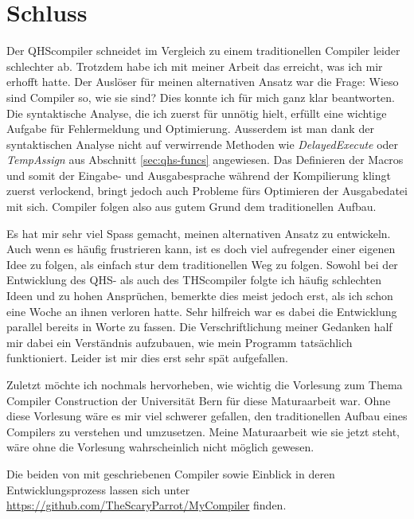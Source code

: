 \chapter{Schluss}
Der QHScompiler schneidet im Vergleich zu einem traditionellen Compiler leider schlechter ab.
Trotzdem habe ich mit meiner Arbeit das erreicht, was ich mir erhofft hatte. Der Auslöser für meinen alternativen Ansatz war die Frage: Wieso sind Compiler so, wie sie sind? 
Dies konnte ich für mich ganz klar beantworten. Die syntaktische Analyse, die ich zuerst für unnötig hielt, erfüllt eine wichtige Aufgabe für Fehlermeldung und Optimierung.
Ausserdem ist man dank der syntaktischen Analyse nicht auf verwirrende Methoden wie \textit{DelayedExecute} oder \textit{TempAssign} aus Abschnitt \ref{sec:qhs-funcs} angewiesen.
Das Definieren der Macros und somit der Eingabe- und Ausgabesprache während der Kompilierung klingt zuerst verlockend, bringt jedoch auch Probleme fürs Optimieren der Ausgabedatei mit sich.
Compiler folgen also aus gutem Grund dem traditionellen Aufbau.

Es hat mir sehr viel Spass gemacht, meinen alternativen Ansatz zu entwickeln. Auch wenn es häufig frustrieren kann, ist es doch viel aufregender einer eigenen Idee zu folgen, als einfach stur dem traditionellen Weg zu folgen.
Sowohl bei der Entwicklung des QHS- als auch des THScompiler folgte ich häufig schlechten Ideen und zu hohen Ansprüchen, bemerkte dies meist jedoch erst, als ich schon eine Woche an ihnen verloren hatte.
Sehr hilfreich war es dabei die Entwicklung parallel bereits in Worte zu fassen. Die Verschriftlichung meiner Gedanken half mir dabei ein Verständnis aufzubauen, wie mein Programm tatsächlich funktioniert.
Leider ist mir dies erst sehr spät aufgefallen.

Zuletzt möchte ich nochmals hervorheben, wie wichtig die Vorlesung zum Thema Compiler Construction der Universität Bern \cite{Lecture} für diese Maturaarbeit war.
Ohne diese Vorlesung wäre es mir viel schwerer gefallen, den traditionellen Aufbau eines Compilers zu verstehen und umzusetzen.
Meine Maturaarbeit wie sie jetzt steht, wäre ohne die Vorlesung wahrscheinlich nicht möglich gewesen.

Die beiden von mit geschriebenen Compiler sowie Einblick in deren Entwicklungsprozess lassen sich unter \url{https://github.com/TheScaryParrot/MyCompiler} finden.

